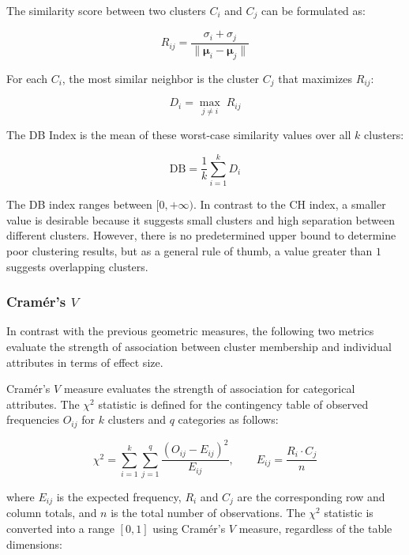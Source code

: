 The similarity score between two clusters $C_i$ and $C_j$ can be formulated as:

\begin{equation}
    R_{ij} = \frac{\sigma_i + \sigma_j}{\|\boldsymbol{\mu}_i - \boldsymbol{\mu}_j\|}
    \label{eq:db_Rij}
\end{equation}

For each $C_i$, the most similar neighbor is the cluster $C_j$ that maximizes $R_{ij}$:

\begin{equation}
    D_i = \max_{j \neq i}\; R_{ij}
    \label{eq:db_Di}
\end{equation}

The DB Index is the mean of these worst-case similarity values over all $k$ clusters:

\begin{equation}
    \mathrm{DB} = \frac{1}{k} \sum_{i=1}^{k} D_i
    \label{eq:db}
\end{equation}

The DB index ranges between $[0, +\infty)$. In contrast to the CH index, a smaller value is desirable because it suggests small clusters and high separation between different clusters. However, there is no predetermined upper bound to determine poor clustering results, but as a general rule of thumb, a value greater than $1$ suggests overlapping clusters.

\subsubsection*{Cramér's $V$}

In contrast with the previous geometric measures, the following two metrics evaluate the strength of association between cluster membership and individual attributes in terms of effect size.

Cramér's $V$ measure \cite{cramer1946} evaluates the strength of association for categorical attributes. The $\chi^2$ statistic is defined for the contingency table of observed frequencies $O_{ij}$ for $k$ clusters and $q$ categories as follows:

\begin{equation}
    \chi^2 = \sum_{i=1}^{k} \sum_{j=1}^{q} \frac{(O_{ij} - E_{ij})^2}{E_{ij}}, \qquad E_{ij} = \frac{R_i \cdot C_j}{n}
    \label{eq:chisq}
\end{equation}

where $E_{ij}$ is the expected frequency, $R_i$ and $C_j$ are the corresponding row and column totals, and $n$ is the total number of observations. The $\chi^2$ statistic is converted into a range $[0, 1]$ using Cramér's $V$ measure, regardless of the table dimensions:

